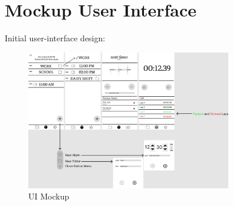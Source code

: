 \documentclass{article}
\begin{document}
\newpage

\section{Mockup User Interface}
Initial user-interface design:
\begin{figure}[h!]
    \centering
    \includegraphics[width=0.8\textwidth, height=0.4\textheight]{../UI_mockup.png}
    \caption{UI Mockup}
\end{figure}
\end{document}
